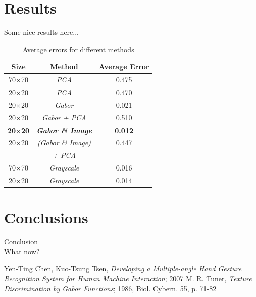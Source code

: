 \documentclass[a4paper, 11pt, twocolumn]{article}
\begin{document}
    \section{Results}
	\label{sec:results}
    	Some nice results here...\\
		\begin{table}[!hbtp]
		\begin{tabular}{| c | c | c |}
			\hline\hline
			\textbf{Size} & \textbf{Method} & \textbf{Average Error}\\ 
			\hline\hline
			  70$\times$70 & \emph{PCA} & 0.475\\
			\hline
			  20$\times$20 & \emph{PCA} & 0.470\\
			\hline
			  20$\times$20 & \emph{Gabor} & 0.021\\
			\hline
			  20$\times$20 & \emph{Gabor + PCA} & 0.510\\
			\hline
			  \textbf{20$\times$20} & \textbf{\emph{Gabor \& Image}} & \textbf{0.012}\\
		 	\hline
			  20$\times$20 & \emph{(Gabor \& Image)} & 0.447\\
		               & \emph {+ PCA}  &     \\ 			
			\hline
			  70$\times$70 & \emph{Grayscale} & 0.016\\
			\hline
			  20$\times$20 & \emph{Grayscale} & 0.014\\
			\hline
		\end{tabular}
		\caption{Average errors for different methods}
		\end{table}

    \section{Conclusions}
	\label{sec:conclusion}
    	Conclusion\\
   	 	What now?
	\begin{thebibliography}{2}
		Yen-Ting Chen, Kuo-Tsung Tsen, \emph{Developing a Multiple-angle Hand Gesture Recognition System for Human Machine Interaction}; 2007
		M. R. Tuner, \emph{Texture Discrimination by Gabor Functions}; 1986, Biol. Cybern. 55, p. 71-82 
	\end{thebibliography}    
\end{document}
